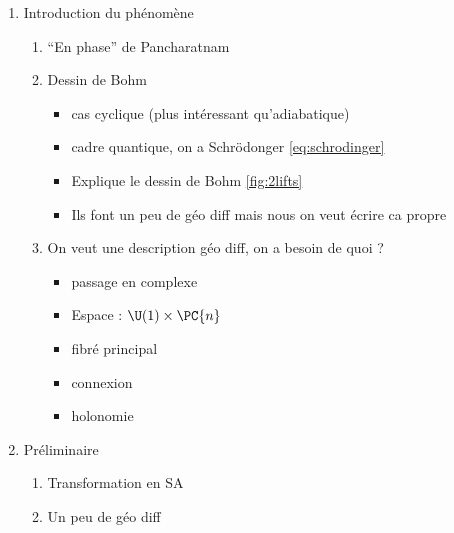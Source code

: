 \begin{enumerate}[label=\Roman* --- ]
	
	\item Introduction du phénomène 
	\begin{enumerate}[label=\arabic* --- ]
		
		\item ``En phase'' de Pancharatnam
		
		\item Dessin de Bohm
		\begin{itemize}
			
			\item cas cyclique (plus intéressant qu'adiabatique)
			
			\item cadre quantique, on a Schrödonger \eqref{eq:schrodinger}
			
			\item Explique le dessin de Bohm \cref{fig:2lifts}
			
			\item Ils font un peu de géo diff \cite{mukunda_quantum_1993,bohm_geometric_2003} mais nous on veut écrire ca propre
		\end{itemize}
		
		\item On veut une description géo diff, on a besoin de quoi ?
		\begin{itemize}
			
			\item passage en complexe
			
			\item Espace : $\U(1)\times\PC{n}$
			
			\item fibré principal 
			
			\item connexion
			
			 \item holonomie
		\end{itemize}
	\end{enumerate}
		
	\item Préliminaire
	\begin{enumerate}[label=\arabic* --- ]
		
		\item Transformation en SA
		
		\item Un peu de géo diff 
		\begin{enumerate}[label=\arabic{enumi}.\arabic* --- ]
			

\end{enumerate}
\end{enumerate}
\end{enumerate}
